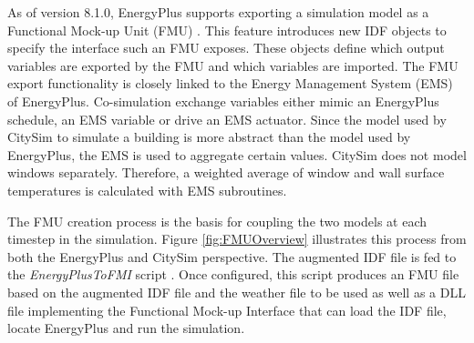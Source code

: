 \documentclass{tBPS2e}
\theoremstyle{plain}
\theoremstyle{definition}
\theoremstyle{remark}
\newcommand{\noteDT}[1]{\footnote{\textcolor{green}{#1}}}
\begin{document}
As of version 8.1.0, EnergyPlus supports exporting a simulation model as a
Functional Mock-up Unit (FMU) \citep{Nouidui:2014hq,Anonymous:ZZTfF80-}. This
feature introduces new IDF objects to specify the interface such an FMU
exposes. These objects define which output variables are exported by the FMU
and which variables are imported. The FMU export functionality is closely
linked to the Energy Management System (EMS) of EnergyPlus. Co-simulation
exchange variables either mimic an EnergyPlus schedule, an EMS variable or
drive an EMS actuator. Since the model used by CitySim to simulate a building
is more abstract than the model used by EnergyPlus, the EMS is used to
aggregate certain values. CitySim does not model windows separately. Therefore,
a weighted average of window and wall surface temperatures is calculated with
EMS subroutines.



The FMU creation process is the basis for coupling the two models at each
timestep in the simulation. Figure \ref{fig:FMUOverview} illustrates this
process from both the EnergyPlus and CitySim perspective. The augmented IDF
file is fed to the \emph{EnergyPlusToFMI} script \citep{Nouidui:2014bo}. Once
configured, this script produces an FMU file based on the augmented IDF file
and the weather file to be used as well as a DLL file implementing the
Functional Mock-up Interface that can load the IDF file, locate EnergyPlus and
run the simulation.
\end{document}
